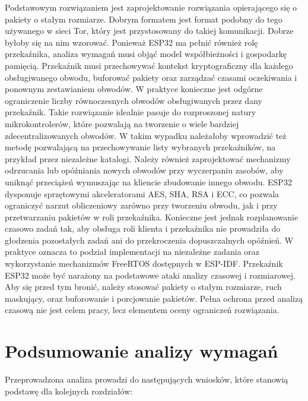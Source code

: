 \documentclass[thesis=inz,faculty=ee]{EE-dyplom}
\begin{document}
    Podstawowym rozwiązaniem jest zaprojektowanie rozwiązania opierającego się o pakiety o stałym rozmiarze. Dobrym formatem jest format podobny do tego używanego w sieci 
    Tor\cite{tor_spec}, który jest przystosowany do takiej komunikacji. Dobrze byłoby się na nim wzorować.
    Ponieważ ESP32 ma pełnić również rolę przekaźnika, analiza wymagań musi objąć model współbieżności i gospodarkę pamięcią. Przekaźnik musi przechowywać kontekst 
    kryptograficzny dla każdego obsługiwanego obwodu, buforować pakiety oraz zarządzać czasami oczekiwania i ponownym zestawianiem obwodów. W praktyce konieczne jest 
    odgórne ograniczenie liczby równoczesnych obwodów obsługiwanych przez dany przekaźnik. Takie rozwiązanie idealnie pasuje do rozproszonej natury mikrokontrolerów, które
    pozwalają na tworzenie o wiele bardziej zdecentralizowanych obwodów. W takim wypadku należałoby wprowadzić też metodę pozwalającą na przechowywanie listy wybranych
    przekaźników, na przykład przez niezależne katalogi. Należy również zaprojektować mechanizmy odrzucania lub opóźniania nowych obwodów przy wyczerpaniu zasobów,
    aby uniknąć przeciążeń wymuszając na kliencie zbudowanie innego obwodu. ESP32 dysponuje sprzętowymi akceleratorami AES, SHA, RSA i ECC, co pozwala ograniczyć narzut 
    obliczeniowy zarówno przy tworzeniu obwodu, jak i przy przetwarzaniu pakietów w roli przekaźnika. Konieczne jest jednak rozplanowanie czasowo zadań tak, aby obsługa roli 
    klienta i przekaźnika nie prowadziła do głodzenia pozostałych zadań ani do przekroczenia dopuszczalnych opóźnień. W praktyce oznacza to podział implementacji na niezależne 
    zadania oraz wykorzystanie mechanizmów FreeRTOS dostępnych w ESP-IDF. Przekaźnik ESP32 może być narażony na podstawowe ataki analizy czasowej i rozmiarowej. Aby się
    przed tym bronić, należy stosować pakiety o stałym rozmiarze, ruch maskujący, oraz buforowanie i porcjowanie pakietów. Pełna ochrona przed analizą czasową nie 
    jest celem pracy, lecz elementem oceny ograniczeń rozwiązania.
 
    \section{Podsumowanie analizy wymagań}

    Przeprowadzona analiza prowadzi do następujących wniosków, które stanowią podstawę dla kolejnych rozdziałów:
\end{document}
